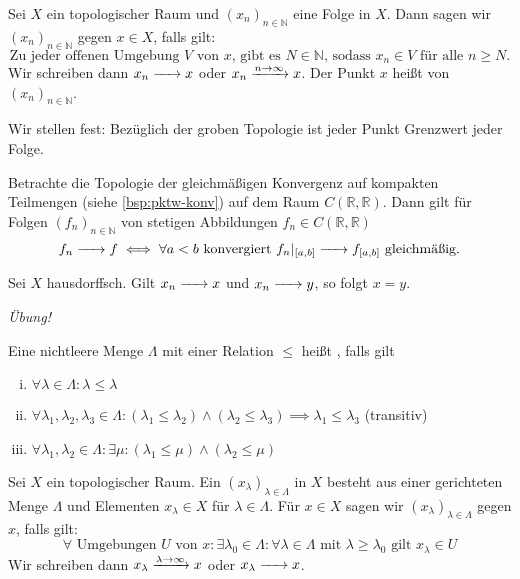 \begin{definition}[{name=[Konvergenz und Grenzwerte]}]
	Sei $X$ ein topologischer Raum und $(x_n)_{n \in \mathbb{N}}$ eine Folge in $X$. 
	Dann sagen wir $(x_n)_{n \in \mathbb{N} }$  gegen $x \in X$, falls gilt:
	\[
		\text{Zu jeder offenen Umgebung $V$ von $x$, gibt es $N \in \mathbb{N}$, sodass $x_n \in V$ für alle $n \ge N$.}
	\]
	Wir schreiben dann $x_n \grenzw{} x$ oder $x_n \grenzwIn{n \to \infty} x$. 
	Der Punkt $x$ heißt  von $(x_n)_{n \in \mathbb{N}}$.
\end{definition}

Wir stellen fest: Bezüglich der groben Topologie ist jeder Punkt Grenzwert jeder Folge.

Betrachte die Topologie der gleichmäßigen Konvergenz auf kompakten Teilmengen (siehe \cref{bsp:pktw-konv}) auf dem Raum $C(\mathbb{R},\mathbb{R})$. 
Dann gilt für Folgen $(f_n)_{n \in \mathbb{N} }$ von stetigen Abbildungen $f_n \in C(\mathbb{R},\mathbb{R})$
\[
	f_n \grenzw{} f \iff \forall a < b \text{ konvergiert } f_n|_{[a,b]} \grenzw{} f_{[a,b]} \text{ gleichmäßig.}
\]

\begin{lemma}[{name=[Eindeutigkeit von Grenzwerten]}]
	Sei $X$ hausdorffsch. Gilt $x_n \grenzw{} x$ und $x_n \grenzw{} y$, so folgt $x=y$.
\end{lemma}
\begin{beweis}
	\emph{Übung!}
\end{beweis}

\begin{definition}[{name=[gerichtete Menge]}]
	Eine nichtleere Menge $\Lambda$ mit einer Relation $\le$ heißt , falls gilt 
	\begin{enumerate}[(i)]
		\item $\forall \lambda  \in \Lambda : \lambda  \le \lambda $
		\item $\forall \lambda_1, \lambda_2, \lambda_3 \in \Lambda  : (\lambda_1 \le \lambda_2) \wedge (\lambda_2 \le \lambda_3) \implies \lambda_1 \le \lambda_3$
		\hfill (transitiv)
		\item $\forall \lambda_1, \lambda_2 \in \Lambda : \exists \mu : (\lambda_1 \le \mu) \wedge (\lambda_2 \le \mu)$
	\end{enumerate}
\end{definition}

\begin{definition}[{name=[Konvergenz von Netzen]}]
	Sei $X$ ein topologischer Raum. 
	Ein  $(x_\lambda)_{\lambda \in \Lambda }$ in $X$ besteht aus einer gerichteten Menge $\Lambda $ und Elementen $x_\lambda \in X$ für $\lambda \in \Lambda $. 
	Für $x \in X$ sagen wir $(x_\lambda )_{\lambda \in \Lambda }$  gegen $x$, falls gilt:
	\[
		\forall \text{ Umgebungen } U \text{ von } x : \exists \lambda_0 \in \Lambda : \forall \lambda \in \Lambda \text{ mit } 
		\lambda \ge \lambda_0 \text{ gilt } x_\lambda \in U
	\]
	Wir schreiben dann $x_\lambda \grenzwIn{\lambda  \to \infty} x$ oder $x_\lambda \grenzw{} x$.
\end{definition}

